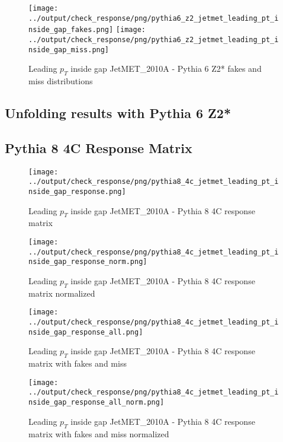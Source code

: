 \documentclass[11pt]{book}
\begin{document}
\begin{figure}[ht]
\centering
\texttt{[image: ../output/check\_response/png/pythia6\_z2\_jetmet\_leading\_pt\_inside\_gap\_fakes.png]}
\texttt{[image: ../output/check\_response/png/pythia6\_z2\_jetmet\_leading\_pt\_inside\_gap\_miss.png]}
\caption{Leading $p_{T}$ inside gap JetMET\_2010A - Pythia 6 Z2* fakes and miss distributions}
\label{p6_jetmet_leading_pt_inside_gap_fakesmiss}
\end{figure}


\clearpage
\subsection{Unfolding results with Pythia 6 Z2*}


\clearpage
\subsection{Pythia 8 4C Response Matrix}


\begin{figure}[ht]
\centering
\texttt{[image: ../output/check\_response/png/pythia8\_4c\_jetmet\_leading\_pt\_inside\_gap\_response.png]}
\caption{Leading $p_{T}$ inside gap JetMET\_2010A - Pythia 8 4C response matrix}
\label{p8_jetmet_leading_pt_inside_gap_response}
\end{figure}

\begin{figure}[ht]
\centering
\texttt{[image: ../output/check\_response/png/pythia8\_4c\_jetmet\_leading\_pt\_inside\_gap\_response\_norm.png]}
\caption{Leading $p_{T}$ inside gap JetMET\_2010A - Pythia 8 4C response matrix normalized}
\label{p8_jetmet_leading_pt_inside_gap_response_norm}
\end{figure}

\begin{figure}[ht]
\centering
\texttt{[image: ../output/check\_response/png/pythia8\_4c\_jetmet\_leading\_pt\_inside\_gap\_response\_all.png]}
\caption{Leading $p_{T}$ inside gap JetMET\_2010A - Pythia 8 4C response matrix with fakes and miss}
\label{p8_jetmet_leading_pt_inside_gap_response_all}
\end{figure}

\begin{figure}[ht]
\centering
\texttt{[image: ../output/check\_response/png/pythia8\_4c\_jetmet\_leading\_pt\_inside\_gap\_response\_all\_norm.png]}
\caption{Leading $p_{T}$ inside gap JetMET\_2010A - Pythia 8 4C response matrix with fakes and miss normalized}
\label{p8_jetmet_leading_pt_inside_gap_response_all_norm}
\end{figure}
\end{document}
